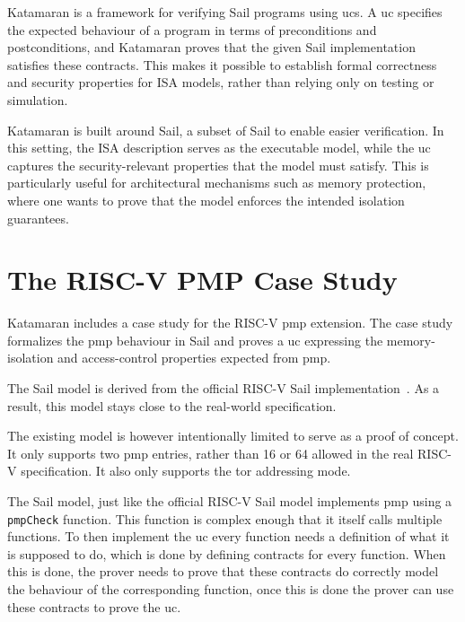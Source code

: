 Katamaran is a framework for verifying \textmu{}Sail programs using \glspl{uc}.  
A \gls{uc} specifies the expected behaviour of a program in terms of preconditions and postconditions, and Katamaran proves that the given \textmu{}Sail implementation satisfies these contracts.
This makes it possible to establish formal correctness and security properties for ISA models, rather than relying only on testing or simulation.~\cite{universal_contract}

Katamaran is built around \textmu{}Sail, a subset of Sail to enable easier verification.
In this setting, the ISA description serves as the executable model, while the \gls{uc} captures the security-relevant properties that the model must satisfy.
This is particularly useful for architectural mechanisms such as memory protection, where one wants to prove that the model enforces the intended isolation guarantees.

\section{The RISC-V PMP Case Study}
Katamaran includes a case study for the RISC-V \gls{pmp} extension.
The case study formalizes the \gls{pmp} behaviour in \textmu{}Sail and proves a \gls{uc} expressing the memory-isolation and access-control properties expected from \gls{pmp}.

The \textmu{}Sail model is derived from the official RISC-V Sail implementation~\cite{risc-v_sail}.
As a result, this model stays close to the real-world specification.

The existing model is however intentionally limited to serve as a proof of concept.
It only supports two \gls{pmp} entries, rather than 16 or 64 allowed in the real RISC-V specification.
It also only supports the \gls{tor} addressing mode.

The \textmu{}Sail model, just like the official RISC-V Sail model implements \gls{pmp} using a \texttt{pmpCheck} function.
This function is complex enough that it itself calls multiple functions.
To then implement the \gls{uc} every function needs a definition of what it is supposed to do, which is done by defining contracts for every function.
When this is done, the prover needs to prove that these contracts do correctly model the behaviour of the corresponding function, once this is done the prover can use these contracts to prove the \gls{uc}.

